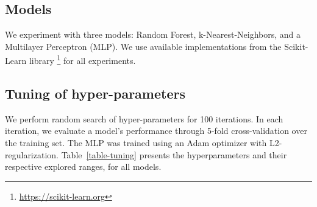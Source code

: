 \documentclass[11pt,a4paper]{article}
\begin{document}
\subsection{Models}

We experiment with three models: Random Forest, k-Nearest-Neighbors, and a Multilayer Perceptron (MLP).
We use available implementations from the Scikit-Learn library \footnote{\url{https://scikit-learn.org}} for all experiments.

\subsection{Tuning of hyper-parameters}
We perform random search  of hyper-parameters for 100 iterations. In each iteration, we evaluate a model's performance through 5-fold cross-validation over the training set. The MLP was trained using an Adam optimizer \cite{kingma2014adam} with L2-regularization.
Table~\ref{table-tuning} presents the hyperparameters and their respective explored ranges, for all models.
\end{document}
